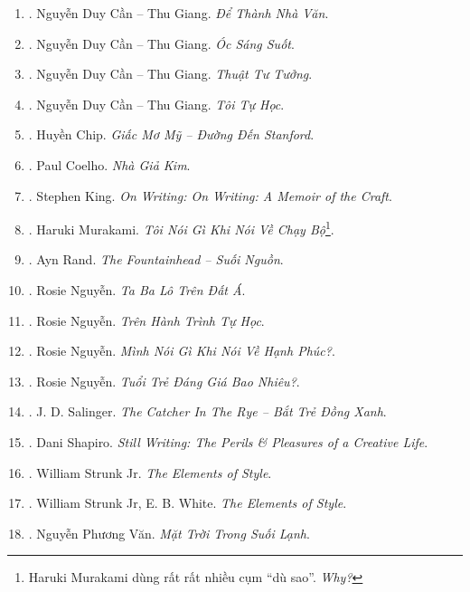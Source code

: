 \documentclass{article}
\begin{document}
\begin{enumerate}
	\item \cite{Can_dtnv}. Nguyễn Duy Cần -- Thu Giang. \textit{Để Thành Nhà Văn}.\hfill{\sf[finished]}
	\item \cite{Can_oss}. Nguyễn Duy Cần -- Thu Giang. \textit{Óc Sáng Suốt}.\hfill{\sf[reading]}
	\item \cite{Can_ttt}. Nguyễn Duy Cần -- Thu Giang. \textit{Thuật Tư Tưởng}.\hfill{\sf[reading]}
	\item \cite{Can_tth}. Nguyễn Duy Cần -- Thu Giang. \textit{Tôi Tự Học}.\hfill{\sf[reading]}
	\item \cite{Chip2018}. Huyền Chip. \textit{Giấc Mơ Mỹ -- Đường Đến Stanford}.\hfill{\sf[finished]}
	\item \cite{Coelho2023}. Paul Coelho. \textit{Nhà Giả Kim}.\hfill{\sf[finished]}
	\item \cite{King2000, King2010}. Stephen King. \textit{On Writing: On Writing: A Memoir of the Craft}.\hfill{\sf[finished]}
	\item \cite{Murakami2023}. Haruki Murakami. \textit{Tôi Nói Gì Khi Nói Về Chạy Bộ}\footnote{Haruki Murakami dùng rất rất nhiều cụm ``dù sao''. \textit{Why?}}.\hfill{\sf[finished]}
	\item \cite{Rand_fountainhead}. Ayn Rand. \textit{The Fountainhead -- Suối Nguồn}.\hfill{\sf[finished]}
	\item \cite{Rosie2021a}. Rosie Nguyễn. \textit{Ta Ba Lô Trên Đất Á}.\hfill{\sf[finished]}
	\item \cite{Rosie2021b}. Rosie Nguyễn. \textit{Trên Hành Trình Tự Học}.\hfill{\sf[finished]}
	\item \cite{Rosie2022a}. Rosie Nguyễn. \textit{Mình Nói Gì Khi Nói Về Hạnh Phúc?}.\hfill{\sf[finished]}
	\item \cite{Rosie2022b}. Rosie Nguyễn. \textit{Tuổi Trẻ Đáng Giá Bao Nhiêu?}.\hfill{\sf[finished]}
	\item \cite{Salinger_btdx}. J. D. Salinger. \textit{The Catcher In The Rye -- Bắt Trẻ Đồng Xanh}.\hfill{\sf[finished]}
	\item \cite{Shapiro2014}. Dani Shapiro. \textit{Still Writing: The Perils \& Pleasures of a Creative Life}.\hfill{\sf[reading]}
	\item \cite{Strunk1918}. William Strunk Jr. \textit{The Elements of Style}.\hfill{\sf[finished]}
	\item \cite{Strunk_White2019}. William Strunk Jr, E. B. White. \textit{The Elements of Style}.\hfill{\sf[finished]}
	\item \cite{Van2022}. Nguyễn Phương Văn. \textit{Mặt Trời Trong Suối Lạnh}.\hfill{\sf[finished]}

\end{enumerate}
\end{document}
